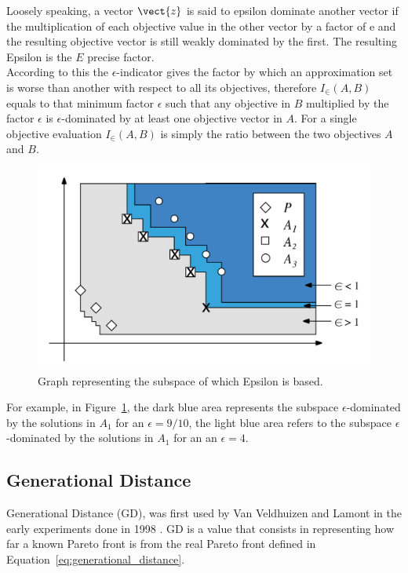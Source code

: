 Loosely speaking, a vector $\vect{z}$ is said to epsilon dominate another vector if the multiplication of each objective value in the other vector by a factor of e and the resulting objective vector is still weakly dominated by the first. The resulting Epsilon is the $E$ precise factor.\\

According to this the $\epsilon$-indicator gives the factor by which an approximation set is worse than another with respect to all its objectives, therefore $I_{\in}(A,B)$ equals to that minimum factor $\epsilon$ such that any objective in $B$ multiplied by the factor $\epsilon$ is $\epsilon$-dominated by at least one objective vector in $A$. For a single objective evaluation $I_{\in}(A, B)$ is simply the ratio between the two objectives $A$ and $B$.\\

\begin{figure}
    \centering
    \includegraphics[width=\textwidth]{images/epsiolon.png}
    \caption{Graph representing the subspace of which Epsilon is based.}
    \label{fig:epsilon_graph}
\end{figure}

For example, in Figure~\ref{fig:epsilon_graph}, the dark blue area represents the subspace $\epsilon$-dominated by the solutions in $A_{1}$ for an $\epsilon = 9/10$, the light blue area refers to the subspace $\epsilon$-dominated by the solutions in $A_{1}$ for an an $\epsilon = 4$.

\subsection{Generational Distance}

Generational Distance (GD), was first used by Van Veldhuizen and Lamont in the early experiments done in 1998 \cite{van1998evolutionary}. GD is a value that consists in representing how far a known Pareto front is from the real Pareto front defined in Equation~\ref{eq:generational_distance}.

